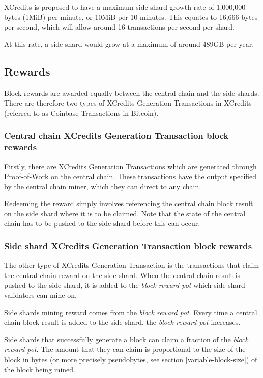 \documentclass[a4paper,12pt]{article}
\begin{document}
XCredits is proposed to have a maximum side shard growth rate of 1,000,000 bytes (1MiB) per minute, or 10MiB per 10 minutes. This equates to 16,666 bytes per second, which will allow around 16 transactions per second per shard.

At this rate, a side shard would grow at a maximum of around 489GB per year. 


\subsection{Rewards}
Block rewards are awarded equally between the central chain and the side shards. There are therefore two types of XCredits Generation Transactions in XCredits (referred to as Coinbase Transactions in Bitcoin).

\subsubsection{Central chain XCredits Generation Transaction  block rewards}
Firstly, there are XCredits Generation Transactions which are generated through Proof-of-Work on the central chain. These transactions have the output specified by the central chain miner, which they can direct to any chain. 

Redeeming the reward simply involves referencing the central chain block result on the side shard where it is to be claimed. Note that the state of the central chain has to be pushed to the side shard before this can occur. 

\subsubsection{Side shard XCredits Generation Transaction block rewards}
The other type of XCredits Generation Transaction is the transactions that claim the central chain reward on the side shard. When the central chain result is pushed to the side shard, it is added to the \textit{block reward pot} which side shard validators can mine on.

Side shards mining reward comes from the \textit{block reward pot}. Every time a central chain block result is added to the side shard, the \textit{block reward pot} increases. 

Side shards that successfully generate a block can claim a fraction of the \textit{block reward pot}. The amount that they can claim is proportional to the size of the block in bytes (or more precisely pseudobytes, see section \ref{variable-block-size}) of the block being mined. 
\end{document}
